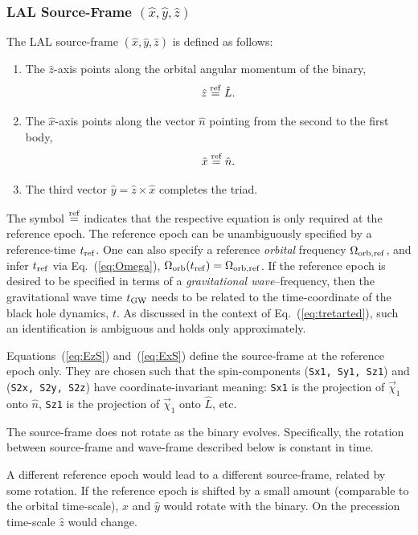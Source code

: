 \documentclass[11pt,tightenlines,article,amssymb,amsmath,amsfonts,superscriptaddress,nofootinbib]{revtex4}
\newcommand{\nNR}{\hat{n}}
\newcommand{\lNR}{\hat L}
\newcommand{\tGW}{t_{\rm GW}}
\newcommand{\ExS}{{{\hat x}}}
\newcommand{\EyS}{{{\hat y}}}
\newcommand{\EzS}{{{\hat z}}}
\newcommand{\equalref}{\overset{\rm ref}{=}}
\begin{document}
\subsubsection{LAL Source-Frame \boldmath$(\ExS, \EyS, \EzS)$}


The LAL source-frame $(\ExS, \EyS, \EzS)$ is defined as follows:
\begin{enumerate}
\item The $\EzS$-axis points along the orbital angular momentum of the binary,
  \begin{equation}\label{eq:EzS}
    \EzS\equalref \lNR.
  \end{equation}
\item The $\ExS$-axis points along the vector $\nNR$ pointing from the second
  to the first body,
  \begin{equation}\label{eq:ExS}
    \ExS\equalref\nNR.
  \end{equation}
\item The third vector $\EyS=\EzS\times\ExS$ completes the triad.
\end{enumerate}
The symbol $\equalref$ indicates that the
respective equation is only required at the reference epoch.  The
reference epoch can be unambiguously specified by a reference-time
$t_{\rm ref}$.  One can also specify a reference \emph{orbital}
frequency $\Omega_{\rm orb,ref}$, and infer $t_{\rm ref}$ via
Eq.~(\ref{eq:Omega}), $\Omega_{\rm orb}(t_{\rm ref})=\Omega_{\rm orb, ref}$.  If the
reference epoch is desired to be specified in terms of a
\emph{gravitational wave}--frequency, then the gravitational wave time
$\tGW$ needs to be related to the time-coordinate of the black hole
dynamics, $t$.  As discussed in the context of
Eq.~(\ref{eq:tretarted}), such an identification is ambiguous and
holds only approximately.

Equations~(\ref{eq:EzS}) and~(\ref{eq:ExS}) define the source-frame at
the reference epoch only.  They are chosen such that the
spin-components ({\tt Sx1, Sy1, Sz1}) and ({\tt S2x, S2y, S2z}) have
coordinate-invariant meaning: {\tt Sx1} is the projection of
$\vec\chi_1$ onto $\nNR$, {\tt Sz1} is the projection of $\vec\chi_1$
onto $\lNR$, etc.

The source-frame does not rotate as the binary evolves.  Specifically,
the rotation between source-frame and wave-frame described below is
constant in time.

A different reference epoch would lead to a different source-frame,
related by some rotation.  If the reference epoch is shifted by a
small amount (comparable to the orbital time-scale), $\ExS$ and $\EyS$
would rotate with the binary.  On the precession time-scale $\EzS$
would change.
\end{document}
